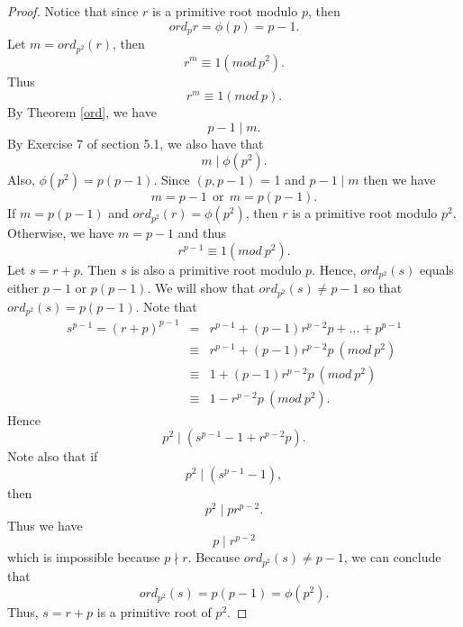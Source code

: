 \documentclass[12pt,letterpaper]{book}
\begin{document}
\begin{proof}
Notice that since $r$ is a primitive root modulo $p$, then
\begin{equation*}
ord_pr=\phi(p)=p-1.
\end{equation*}
Let $m=ord_{p^2}(r)$, then
\begin{equation*}
r^m\equiv 1(mod \ p^2).
\end{equation*}
Thus
\begin{equation*}
r^m\equiv 1(mod \ p).
\end{equation*}
By Theorem \ref{ord}, we have
\begin{equation*}
p-1\mid m.
\end{equation*}
By Exercise 7 of section 5.1, we also have that
\begin{equation*}
m\mid \phi(p^2).
\end{equation*}
Also, $\phi(p^2)=p(p-1)$.  Since $(p,p-1)$ = 1 
and $p-1\mid m$ then we have
\begin{equation*}
m=p-1 \ \ \mbox{or} \ \ m=p(p-1).
\end{equation*}
If $m=p(p-1)$ and $ord_{p^2}(r)=\phi(p^2)$, then $r$ is a primitive
root modulo $p^2$. Otherwise, we have $m=p-1$ and thus
\begin{equation*}
r^{p-1}\equiv 1(mod \ p^2).
\end{equation*}
Let $s=r+p$.  Then $s$ is also a primitive root modulo $p$.  Hence,
$ord_{p^2}(s)$ equals either $p-1$ or $p(p-1)$. We will show that
$ord_{p^2}(s)\neq p-1$ so that\\ $ord_{p^2}(s)=p(p-1)$. Note that
\begin{eqnarray*}
s^{p-1}=(r+p)^{p-1}&=&r^{p-1}+(p-1)r^{p-2}p+...+p^{p-1}\\& \equiv &
r^{p-1}+(p-1)r^{p-2}p~(mod \ p^2)\\& \equiv & 1+(p-1)r^{p-2}p~(mod \ p^2)\\& \equiv & 1-r^{p-2}p~(mod \ p^2).
\end{eqnarray*}
Hence
\begin{equation*}
p^2\mid (s^{p-1}-1+r^{p-2}p).
\end{equation*}
Note also that if
\begin{equation*}
p^2 \mid (s^{p-1}-1),
\end{equation*}
 then
\begin{equation*}
p^2\mid pr^{p-2}.
\end{equation*}
Thus we have
\begin{equation*}
p\mid r^{p-2}
\end{equation*}
which is impossible because $p\nmid r$. Because $ord_{p^2}(s)\neq
p-1$, we can conclude that
\begin{equation*}
ord_{p^2}(s)=p(p-1)=\phi(p^2).
\end{equation*}
Thus, $s=r+p$ is a primitive root of $p^2$.
\end{proof}
\end{document}

